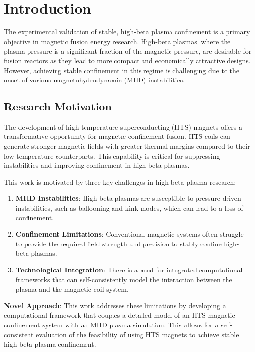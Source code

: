 \documentclass[10pt,twocolumn]{article}
\begin{document}
\section{Introduction}

The experimental validation of stable, high-beta plasma confinement is a primary objective in magnetic fusion energy research. High-beta plasmas, where the plasma pressure is a significant fraction of the magnetic pressure, are desirable for fusion reactors as they lead to more compact and economically attractive designs. However, achieving stable confinement in this regime is challenging due to the onset of various magnetohydrodynamic (MHD) instabilities.

\subsection{Research Motivation}

The development of high-temperature superconducting (HTS) magnets offers a transformative opportunity for magnetic confinement fusion. HTS coils can generate stronger magnetic fields with greater thermal margins compared to their low-temperature counterparts. This capability is critical for suppressing instabilities and improving confinement in high-beta plasmas.

This work is motivated by three key challenges in high-beta plasma research:
\begin{enumerate}
\item \textbf{MHD Instabilities}: High-beta plasmas are susceptible to pressure-driven instabilities, such as ballooning and kink modes, which can lead to a loss of confinement.
\item \textbf{Confinement Limitations}: Conventional magnetic systems often struggle to provide the required field strength and precision to stably confine high-beta plasmas.
\item \textbf{Technological Integration}: There is a need for integrated computational frameworks that can self-consistently model the interaction between the plasma and the magnetic coil system.
\end{enumerate}

\textbf{Novel Approach}: This work addresses these limitations by developing a computational framework that couples a detailed model of an HTS magnetic confinement system with an MHD plasma simulation. This allows for a self-consistent evaluation of the feasibility of using HTS magnets to achieve stable high-beta plasma confinement.
\end{document}
